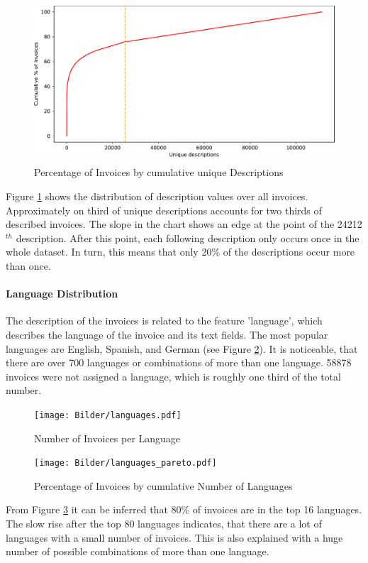 \begin{figure}[!h]
	\centering
	\includegraphics[height=6cm]{Bilder/data_understanding/descriptions_pareto.pdf}
	\caption{Percentage of Invoices by cumulative unique Descriptions}
	\label{fig:descr-pareto}
\end{figure}
Figure \ref{fig:descr-pareto} shows the distribution of description values over all invoices. Approximately on third of unique descriptions accounts for two thirds of described invoices. The slope in the chart shows an edge at the point of the 24212$^{th}$ description. After this point, each following description only occurs once in the whole dataset. In turn, this means that only 20\% of the descriptions occur more than once.


\paragraph{Language Distribution}
The description of the invoices is related to the feature 'language', which describes the language of the invoice and its text fields. The most popular languages are English, Spanish, and German (see Figure \ref{fig:languages-bar}). It is noticeable, that there are over 700 languages or combinations of more than one language. 58878 invoices were not assigned a language, which is roughly one third of the total number.
\begin{figure}[h!]
	\centering
	\texttt{[image: Bilder/languages.pdf]}
	\caption{Number of Invoices per Language}
	\label{fig:languages-bar}
\end{figure}

\begin{figure}[h!]
	\centering
	\texttt{[image: Bilder/languages\_pareto.pdf]}
	\caption{Percentage of Invoices by cumulative Number of Languages}
	\label{fig:languages-pareto}
\end{figure}


From Figure \ref{fig:languages-pareto} it can be inferred that 80\% of invoices are in the top 16 languages. The slow rise after the top 80 languages indicates, that there are a lot of languages with a small number of invoices. This is also explained with a huge number of possible combinations of more than one language.



